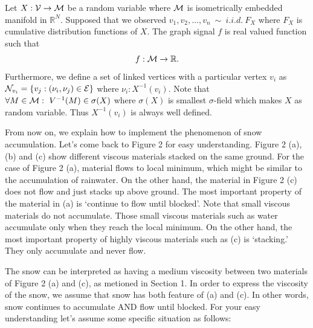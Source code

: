 \documentclass[preprint, review, 12pt]{article}
\theoremstyle{definition}
\theoremstyle{remark}
\begin{document}
Let $X:{\cal V} \to {\cal M}$ be a random variable where ${\cal M}$ is isometrically embedded manifold in $\mathbb{R}^{N}$. Supposed that we observed $v_1,v_2,\dots,v_n ~\sim~ i.i.d. ~ F_X$ where $F_X$ is cumulative distribution functions of $X$. The graph signal $f$ is real valued function such that 
\[
f : {\cal M} \to \mathbb{R}.
\]
Furthermore, we define a set of linked vertices with a particular vertex $v_i$ as ${\cal N}_{v_i}=\{v_j: (\nu_i,\nu_j) \in {\cal E} \}$ where $\nu_i:X^{-1}(v_i)$.
Note that $\forall M \in {\cal M} : ~ V^{-1}(M) \in \sigma(X)$ where $\sigma(X)$ is smallest $\sigma$-field which makes $X$ as random variable. Thus $X^{-1}(v_i)$ is always well defined. 


From now on, we explain how to implement the phenomenon of snow accumulation. Let's come back to Figure 2 for easy understanding. Figure 2 (a), (b) and (c) show different viscous materials stacked on the same ground. For the case of Figure 2 (a), material flows to local minimum, which might be similar to the accumulation of rainwater. On the other hand, the material in Figure 2 (c) does not flow and just stacks up above ground. The most important property of the material in (a) is `continue to flow until blocked'. Note that small viscous materials do not accumulate. Those small viscous materials such as water accumulate only when they reach the local minimum. On the other hand, the most important property of highly viscous materials such as (c) is `stacking.' They only accumulate and never flow. 

The snow can be interpreted as having a medium viscosity between two materials of Figure 2 (a) and (c), as metioned in Section 1. In order to express the viscosity of the snow, we assume that snow has both feature of (a) and (c). In other words, snow continues to accumulate AND flow until blocked. 
For your easy understanding let's assume some specific situation as follows: 
\end{document}
